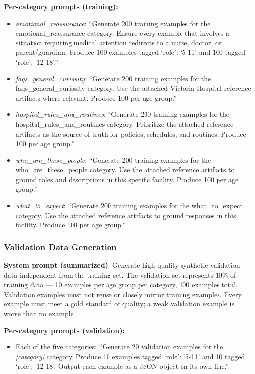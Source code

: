\documentclass[journal]{IEEEtai}
\begin{document}
\noindent\textbf{Per-category prompts (training):}
\begin{itemize}
  \item \textit{emotional\_reassurance}: ``Generate 200 training examples for the emotional\_reassurance category. Ensure every example that involves a situation requiring medical attention redirects to a nurse, doctor, or parent/guardian. Produce 100 examples tagged `role': `5-11' and 100 tagged `role': `12-18'.''
  \item \textit{faqs\_general\_curiosity}: ``Generate 200 training examples for the faqs\_general\_curiosity category. Use the attached Victoria Hospital reference artifacts where relevant. Produce 100 per age group.''
  \item \textit{hospital\_rules\_and\_routines}: ``Generate 200 training examples for the hospital\_rules\_and\_routines category. Prioritize the attached reference artifacts as the source of truth for policies, schedules, and routines. Produce 100 per age group.''
  \item \textit{who\_are\_these\_people}: ``Generate 200 training examples for the who\_are\_these\_people category. Use the attached reference artifacts to ground roles and descriptions in this specific facility. Produce 100 per age group.''
  \item \textit{what\_to\_expect}: ``Generate 200 training examples for the what\_to\_expect category. Use the attached reference artifacts to ground responses in this facility. Produce 100 per age group.''
\end{itemize}

\subsubsection*{Validation Data Generation}

\noindent\textbf{System prompt (summarized):} Generate high-quality synthetic validation data independent from the training set. The validation set represents 10\% of training data --- 10 examples per age group per category, 100 examples total. Validation examples must not reuse or closely mirror training examples. Every example must meet a gold standard of quality; a weak validation example is worse than no example.

\noindent\textbf{Per-category prompts (validation):}
\begin{itemize}
  \item Each of the five categories: ``Generate 20 validation examples for the \textit{[category]} category. Produce 10 examples tagged `role': `5-11' and 10 tagged `role': `12-18'. Output each example as a JSON object on its own line.''
\end{itemize}
\end{document}

